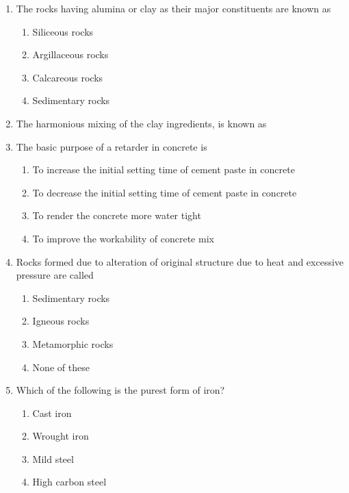 \documentclass[11pt,a4paper]{article}
\begin{document}
\begin{enumerate}
\item{The rocks having alumina or clay as their major constituents are known as}
\begin{enumerate}[label=\Alph*.]
\item{Siliceous rocks}
\item{Argillaceous rocks}
\item{Calcareous rocks}
\item{Sedimentary rocks}
\end{enumerate}
\item{The harmonious mixing of the clay ingredients, is known as}
\\
\item{The basic purpose of a retarder in concrete is}
\begin{enumerate}[label=\Alph*.]
\item{To increase the initial setting time of cement paste in concrete}
\item{To decrease the initial setting time of cement paste in concrete}
\item{To render the concrete more water tight}
\item{To improve the workability of concrete mix}
\end{enumerate}
\item{Rocks formed due to alteration of original structure due to heat and excessive pressure are called}
\begin{enumerate}[label=\Alph*.]
\item{Sedimentary rocks}
\item{Igneous rocks}
\item{Metamorphic rocks}
\item{None of these}
\end{enumerate}
\item{Which of the following is the purest form of iron?}
\begin{enumerate}[label=\Alph*.]
\item{Cast iron}
\item{Wrought iron}
\item{Mild steel}
\item{High carbon steel}
\end{enumerate}

\end{enumerate}
\end{document}
